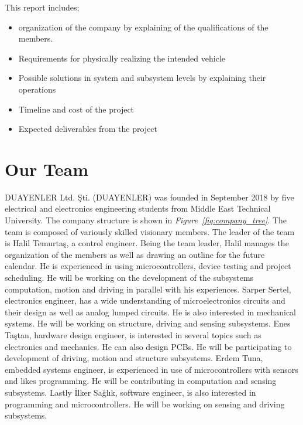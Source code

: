 \documentclass[a4paper,12pt]{article}
\begin{document}
This report includes;
\begin{itemize}
	\item organization of the company by explaining of the qualifications of the members. 
	\item Requirements for physically realizing the intended vehicle
	\item Possible solutions in system and subsystem levels by explaining their operations
	\item Timeline and cost of the project
	\item Expected deliverables from the project 
\end{itemize} 



\section{Our Team}

	DUAYENLER Ltd. Şti. (DUAYENLER) was founded in September 2018 by five electrical and electronics engineering students from Middle East Technical University. The company structure is shown in \textit{Figure~\ref{fig:company_tree}}. The team is composed of variously skilled visionary members. The leader of the team is Halil Temurtaş, a control engineer. Being the team leader, Halil manages the organization of the members as well as drawing an outline for the future calendar. He is experienced in using microcontrollers, device testing and project scheduling. He will be working on the development of the subsystems computation, motion and driving in parallel with his experiences. Sarper Sertel, electronics engineer, has a wide understanding of microelectronics circuits and their design as well as analog lumped circuits. He is also interested in mechanical systems. He will be working on structure, driving and sensing subsystems. Enes Taştan, hardware design engineer, is interested in several topics such as electronics and mechanics. He can also design PCBs. He will be participating to development of driving, motion and structure subsystems. Erdem Tuna, embedded systems engineer, is experienced in use of microcontrollers with sensors and likes programming. He will be contributing in computation and sensing subsystems. Lastly İlker Sağlık, software engineer, is also interested in programming and microcontrollers. He will be working on sensing and driving subsystems.
\end{document}
